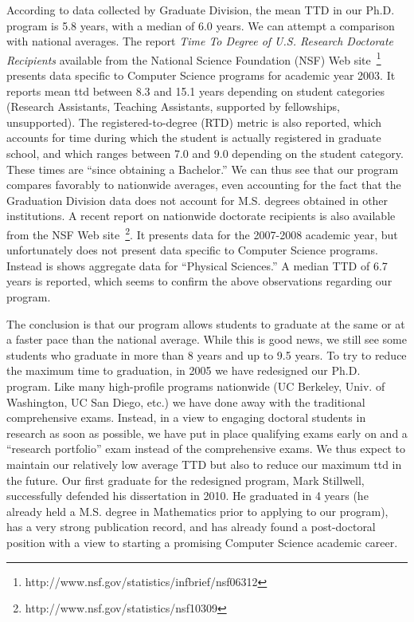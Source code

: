 \documentclass[12pt]{article}
\begin{document}
According to data collected by Graduate Division, the mean TTD in our
Ph.D. program is 5.8 years, with a median of 6.0 years. We can attempt
a comparison with national averages. The report \emph{Time
To Degree of U.S. Research Doctorate Recipients} available from the
National Science Foundation (NSF) Web
site~\footnote{http://www.nsf.gov/statistics/infbrief/nsf06312}
presents data specific to Computer Science programs for academic year
2003. It reports mean ttd between 8.3 and 15.1 years depending on
student categories (Research Assistants, Teaching Assistants,
supported by fellowships, unsupported). The registered-to-degree (RTD)
metric is also reported, which accounts for time during which the
student is actually registered in graduate school, and which ranges
between 7.0 and 9.0 depending on the student category. These times are
``since obtaining a Bachelor.'' We can thus see that our program
compares favorably to nationwide averages, even accounting for the
fact that the Graduation Division data does not account for M.S.
degrees obtained in other institutions.  A recent report on nationwide
doctorate recipients is also available from the NSF Web
site~\footnote{http://www.nsf.gov/statistics/nsf10309}. It presents
data for the 2007-2008 academic year, but unfortunately does not
present data specific to Computer Science programs. Instead is shows
aggregate data for ``Physical Sciences.'' A median TTD of 6.7 years is
reported, which seems to confirm the above observations regarding our program.

The conclusion is that our program allows students to graduate at the
same or at a faster pace than the national average.  While this is good
news, we still see some students who graduate in more than 8 years and up
to 9.5 years. To try to reduce the maximum time to graduation, in 2005
we have redesigned our Ph.D. program.  Like many high-profile programs
nationwide (UC Berkeley, Univ.  of Washington, UC San Diego, etc.) we
have done away with the traditional comprehensive exams.  Instead, in
a view to engaging doctoral students in research as soon as possible,
we have put in place qualifying exams early on and a ``research
portfolio'' exam instead of the comprehensive exams. We thus expect to
maintain our relatively low average TTD but also to reduce our maximum
ttd in the future. Our first graduate for the redesigned program, Mark
Stillwell, successfully defended his dissertation in 2010. He
graduated in 4 years (he already held a M.S. degree in
Mathematics prior to applying to our program), has a very strong
publication record, and has already found a post-doctoral position with
a view to starting a promising Computer Science academic career.
\end{document}
